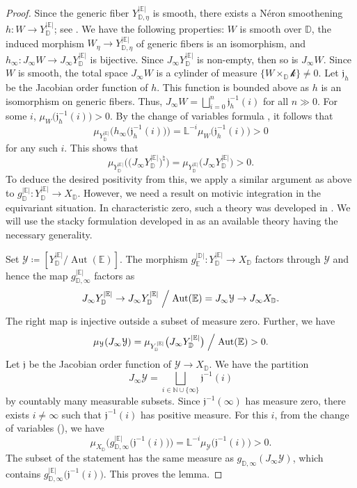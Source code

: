 \documentclass[12pt]{amsart}
\theoremstyle{plain}   %
\theoremstyle{definition}    %
\theoremstyle{remark}    %
\numberwithin{equation}{theorem}
\DeclareMathOperator{\Aut}{{Aut}}
\newcommand{\kay}{\mathcal{k}}
\newcommand{\sY}{\mathcal{Y}}
\newcommand{\bD}{\mathbb{D}}
\newcommand{\bE}{\mathbb{E}}
\newcommand{\bL}{\mathbb{L}}
\newcommand{\bN}{\mathbb{N}}
\begin{document}
\begin{proof}
Since the generic fiber $Y_{\bD,\eta}^{|\bE|}$ is smooth, there exists a N\'eron smoothening $h\colon W\to Y_\bD^{|\bE|}$; see \cite[\S3.1]{BoschLutkebohmertRaynaudNeronModels}. We have the following properties: $W$ is smooth over $\bD$, the induced morphism $W_\eta \to Y_{\bD,\eta}^{|\bE|}$ of generic fibers is an isomorphism, and $h_\infty \colon J_\infty W \to J_{\infty} Y_\bD^{|\bE|}$ is bijective.
Since $J_{\infty} Y_\bD^{|\bE|}$ is non-empty, then so is $J_{\infty} W$. Since $W$ is smooth, the total space $J_{\infty} W$ is a cylinder of  measure $\{W\times _\bD \kay \}\ne 0$. 
Let $\mathfrak{j}_h$ be the Jacobian order function of $h$. This function is bounded above as $h$ is an isomorphism on generic fibers. Thus, $J_\infty W =\bigsqcup_{i=0}^n \mathfrak{j}_h^{-1}(i)$ for all $n\gg 0$. For some $i$, $\mu_W\big(\mathfrak{j}_h^{-1}(i)\big)>0$. By the change of variables formula \cite[Theorem 8.0.5]{SebagIntegrationMotiviqueSurLesSchemasFormels}, it follows that
\[
\mu_{Y_\bD^{|\bE|}}\Big(h_\infty\big(\mathfrak{j}_h^{-1}(i)\big)\Big)=\bL^{-i}\mu_W\big(\mathfrak{j}_h^{-1}(i)\big)>0
\]
for any such $i$. This shows that  
\[
\mu_{Y_\bD^{|\bE|}}\Big(\big(J_\infty Y_\bD^{|\bE|}\big)^\natural\Big)=\mu_{Y_\bD^{|\bE|}}\big(J_\infty Y_\bD^{|\bE|}\big)>0. 
\]
To deduce the desired positivity from this, we apply a similar argument as above to $g_\bD^{|\bE|}\colon Y_\bD^{|\bE|}\to X_\bD$. However, we need a result on motivic integration in the equivariant situation. In characteristic zero, such a theory was developed in \cite{DenefLoeserMotivicIntegrationQuotientSingularitiesMcKayCorrespondnence}. We will use the stacky formulation developed in \cite{YasudaMotivicIntegrationDeligneMumfordStack} as an available theory having the necessary generality. 

Set $\sY \coloneqq [Y_\bD^{|\bE|}/\Aut(\bE)]$. 
The morphism $g_\bE^{|\bD|} \colon Y_{\bD}^{|\bE|} \to X_{\bD}$ factors through $\sY$ and hence the map $g_{\bD,\infty}^{|\bE|}$ factors as
\[
 J_\infty Y_\bD^{|\bE|} \to J_\infty Y_\bD^{|\bE|}\Bigm/\Aut(\bE)= J_\infty \sY \to J_\infty X_\bD . 
\]
The right map is injective outside a subset of measure zero.
Further, we have
\[
\mu_\sY(J_\infty \sY)=\mu_{Y_\bD^{|\bE|}}\big(J_\infty Y_\bD^{|\bE|}\big)\Bigm/\Aut(\bE)>0. 
\]
Let $\mathfrak{j}$ be the Jacobian order function of $\sY\to X_\bD$. We have the partition 
\[
J_\infty \sY =\bigsqcup_{i\in \bN \cup\{\infty\}} \mathfrak{j}^{-1}(i)
\]
by countably many measurable subsets. Since $\mathfrak{j}^{-1}(\infty)$ has measure zero, there exists $i\ne \infty$ such that $\mathfrak{j}^{-1}(i)$ has positive measure. For this $i$, from the change of variables (\cite[Theorem 10.26 or 11.13]{YasudaMotivicIntegrationDeligneMumfordStack}), we have
\[
 \mu_{X_\bD}\Big(g_{\bD, \infty}^{|\bE|}\big(\mathfrak{j}^{-1}(i)\big)\Big)=\bL^{-i}\mu_\sY\big(\mathfrak{j}^{-1}(i)\big)>0.
\]
The subset of the statement has the same measure as $g_{\bD,\infty} (J_\infty \sY)$, which contains $g_{\bD,\infty}^{|\bE|}\big(\mathfrak{j}^{-1}(i)\big)$. This proves the lemma. 
\end{proof}
\end{document}
